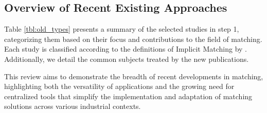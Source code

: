     
    
    \subsection{Overview of Recent Existing Approaches}
    Table \ref{tbl:old_types} presents a summary of the selected studies in step 1, categorizing them based on their focus and contributions to the field of matching. Each study is classified according to the definitions of Implicit Matching by \cite{ieee_survey}. Additionally, we detail the common subjects treated by the new publications.

    

    
    
    This review aims to demonstrate the breadth of recent developments in matching, highlighting both the versatility of applications and the growing need for centralized tools that simplify the implementation and adaptation of matching solutions across various industrial contexts.

